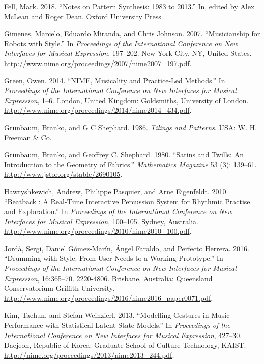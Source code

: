 \documentclass{nime-alternate} %
\newlength{\cslhangindent}
\newenvironment{cslreferences}%
  {\setlength{\parindent}{0pt}%
  \everypar{\setlength{\hangindent}{\cslhangindent}}\ignorespaces}%
  {\par}
\begin{document}
\begin{cslreferences}
\leavevmode\hypertarget{ref-Fell18}{}%
Fell, Mark. 2018. ``Notes on Pattern Synthesis: 1983 to 2013.'' In,
edited by Alex McLean and Roger Dean. Oxford University Press.

\leavevmode\hypertarget{ref-Gimenes2007}{}%
Gimenes, Marcelo, Eduardo Miranda, and Chris Johnson. 2007.
``Musicianship for Robots with Style.'' In \emph{Proceedings of the
International Conference on New Interfaces for Musical Expression},
197--202. New York City, NY, United States.
\url{http://www.nime.org/proceedings/2007/nime2007_197.pdf}.

\leavevmode\hypertarget{ref-ogreen2014}{}%
Green, Owen. 2014. ``NIME, Musicality and Practice-Led Methods.'' In
\emph{Proceedings of the International Conference on New Interfaces for
Musical Expression}, 1--6. London, United Kingdom: Goldsmiths,
University of London.
\url{http://www.nime.org/proceedings/2014/nime2014_434.pdf}.

\leavevmode\hypertarget{ref-Greunbaum86}{}%
Grünbaum, Branko, and G C Shephard. 1986. \emph{Tilings and Patterns}.
USA: W. H. Freeman \& Co.

\leavevmode\hypertarget{ref-Gruenbaum80}{}%
Grünbaum, Branko, and Geoffrey C. Shephard. 1980. ``Satins and Twills:
An Introduction to the Geometry of Fabrics.'' \emph{Mathematics
Magazine} 53 (3): 139--61. \url{http://www.jstor.org/stable/2690105}.

\leavevmode\hypertarget{ref-Hawryshkewich2010}{}%
Hawryshkewich, Andrew, Philippe Pasquier, and Arne Eigenfeldt. 2010.
``Beatback : A Real-Time Interactive Percussion System for Rhythmic
Practise and Exploration.'' In \emph{Proceedings of the International
Conference on New Interfaces for Musical Expression}, 100--105. Sydney,
Australia. \url{http://www.nime.org/proceedings/2010/nime2010_100.pdf}.

\leavevmode\hypertarget{ref-Jordnicode2252016}{}%
Jordà, Sergi, Daniel Gómez-Marín, Ángel Faraldo, and Perfecto Herrera.
2016. ``Drumming with Style: From User Needs to a Working Prototype.''
In \emph{Proceedings of the International Conference on New Interfaces
for Musical Expression}, 16:365--70. 2220-4806. Brisbane, Australia:
Queensland Conservatorium Griffith University.
\url{http://www.nime.org/proceedings/2016/nime2016_paper0071.pdf}.

\leavevmode\hypertarget{ref-Kim2013}{}%
Kim, Taehun, and Stefan Weinzierl. 2013. ``Modelling Gestures in Music
Performance with Statistical Latent-State Models.'' In \emph{Proceedings
of the International Conference on New Interfaces for Musical
Expression}, 427--30. Daejeon, Republic of Korea: Graduate School of
Culture Technology, KAIST.
\url{http://nime.org/proceedings/2013/nime2013_244.pdf}.


\end{cslreferences}
\end{document}
